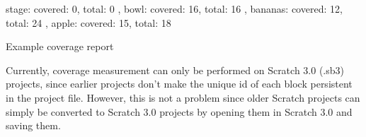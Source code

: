 \begin{listing}[htpb]
    \centering

    \begin{minipage}{.5\textwidth}
        \begin{javascriptcode}
              { stage: { covered: 0, total: 0 },
                bowl: { covered: 16, total: 16 },
                bananas: { covered: 12, total: 24 },
                apple: { covered: 15, total: 18 } }
        \end{javascriptcode}
    \end{minipage}

    \caption{Example coverage report}
    \label{fig:example_coverage_report}
\end{listing}

Currently, coverage measurement can only be performed on Scratch 3.0 (.sb3) projects,
since earlier projects don't make the unique id of each block persistent in the project file.
However, this is not a problem since older Scratch projects can simply be converted to Scratch 3.0 projects by
opening them in Scratch 3.0 and saving them.
\parspace



